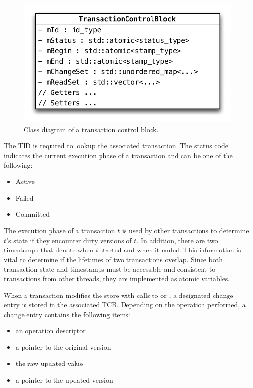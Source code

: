 \begin{figure}[h!]
    \centering
    \includegraphics[scale=.75]{figures/impl/tx.pdf}
    \caption{Class diagram of a transaction control block.}
    \label{fig:tcb}
\end{figure}

The TID is required to lookup the associated transaction. The status code indicates the current execution phase of a transaction and can be one of the following:

\begin{itemize}
    \item Active
    \item Failed
    \item Committed
\end{itemize}

The execution phase of a transaction $t$ is used by other transactions to determine $t$'s state if they encounter dirty versions of $t$. In addition, there are two timestamps that denote when $t$ started and when it ended. This information is vital to determine if the lifetimes of two transactions overlap. Since both transaction state and timestamps must be accessible and consistent to transactions from other threads, they are implemented as atomic variables.

When a transaction modifies the store with calls to  or , a designated change entry is stored in the associated TCB. Depending on the operation performed, a change entry contains the following items:

\begin{itemize}
    \item an operation descriptor
    \item a pointer to the original version
    \item the raw updated value
    \item a pointer to the updated version
\end{itemize}

